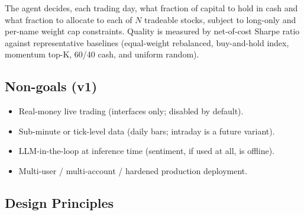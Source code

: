 \documentclass[11pt,a4paper]{article}
\begin{document}
The agent decides, each trading day, what fraction of capital to hold in cash and what
fraction to allocate to each of $N$ tradeable stocks, subject to long-only and per-name
weight cap constraints. Quality is measured by net-of-cost Sharpe ratio against
representative baselines (equal-weight rebalanced, buy-and-hold index, momentum top-K,
60/40 cash, and uniform random).

\subsection{Non-goals (v1)}

\begin{itemize}
\item Real-money live trading (interfaces only; disabled by default).
\item Sub-minute or tick-level data (daily bars; intraday is a future variant).
\item LLM-in-the-loop at inference time (sentiment, if used at all, is offline).
\item Multi-user / multi-account / hardened production deployment.
\end{itemize}

\subsection{Design Principles}
\end{document}
